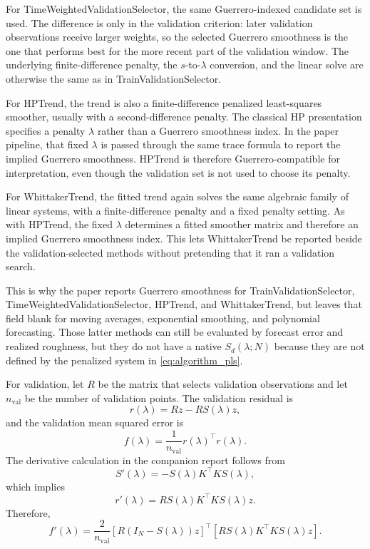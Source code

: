 For TimeWeightedValidationSelector, the same Guerrero-indexed candidate set is
used. The difference is only in the validation criterion: later validation
observations receive larger weights, so the selected Guerrero smoothness is the
one that performs best for the more recent part of the validation window. The
underlying finite-difference penalty, the \(s\)-to-\(\lambda\) conversion, and
the linear solve are otherwise the same as in TrainValidationSelector.

For HPTrend, the trend is also a finite-difference penalized least-squares
smoother, usually with a second-difference penalty. The classical HP
presentation specifies a penalty \(\lambda\) rather than a Guerrero smoothness
index. In the paper pipeline, that fixed \(\lambda\) is passed through the same
trace formula to report the implied Guerrero smoothness. HPTrend is therefore
Guerrero-compatible for interpretation, even though the validation set is not
used to choose its penalty.

For WhittakerTrend, the fitted trend again solves the same algebraic family of
linear systems, with a finite-difference penalty and a fixed penalty setting.
As with HPTrend, the fixed \(\lambda\) determines a fitted smoother matrix and
therefore an implied Guerrero smoothness index. This lets WhittakerTrend be
reported beside the validation-selected methods without pretending that it ran
a validation search.

This is why the paper reports Guerrero smoothness for TrainValidationSelector,
TimeWeightedValidationSelector, HPTrend, and WhittakerTrend, but leaves that
field blank for moving averages, exponential smoothing, and polynomial
forecasting. Those latter methods can still be evaluated by forecast error and
realized roughness, but they do not have a native \(S_d(\lambda;N)\) because
they are not defined by the penalized system in
\eqref{eq:algorithm_pls}.

For validation, let \(R\) be the matrix that selects validation observations and
let \(n_{\mathrm{val}}\) be the number of validation points. The validation
residual is
\[
  r(\lambda) = Rz - R S(\lambda)z,
\]
and the validation mean squared error is
\begin{equation}
\label{eq:algorithm_validation_mse}
  f(\lambda)
  =
  \frac{1}{n_{\mathrm{val}}}
  r(\lambda)^\top r(\lambda).
\end{equation}
The derivative calculation in the companion report follows from
\[
  S'(\lambda)
  =
  -S(\lambda)K^\top K S(\lambda),
\]
which implies
\[
  r'(\lambda)
  =
  R S(\lambda)K^\top K S(\lambda)z.
\]
Therefore,
\begin{equation}
\label{eq:algorithm_validation_derivative}
  f'(\lambda)
  =
  \frac{2}{n_{\mathrm{val}}}
  \left[ R\left(I_N-S(\lambda)\right)z \right]^\top
  \left[ R S(\lambda)K^\top K S(\lambda)z \right].
\end{equation}

